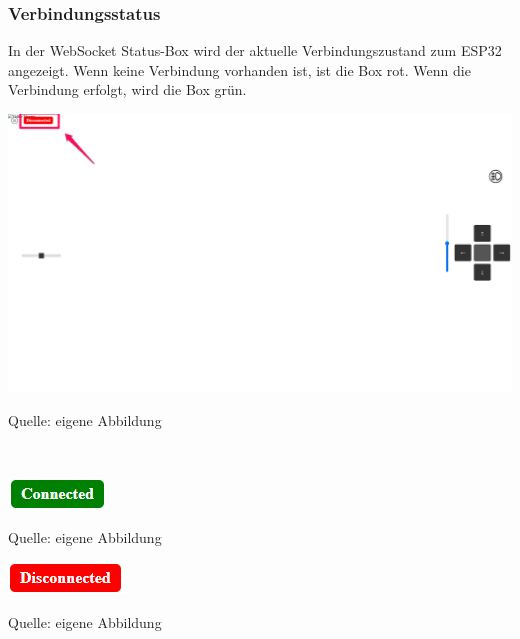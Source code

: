 \documentclass[ngerman,12pt,a4paper]{article}
\begin{document}
				\subsubsection*{Verbindungsstatus}
	
	In der WebSocket Status-Box wird der aktuelle Verbindungszustand zum ESP32 angezeigt. Wenn keine Verbindung vorhanden ist, ist die Box rot. Wenn die Verbindung erfolgt, wird die Box grün. \\[0.5cm]
	\begin{center}
		\begin{minipage}[t]{1\textwidth}
			\includegraphics{Pictures/status-web}
			\label{fig:status-web}
			\vspace{-10pt}
			\begin{center}
				\par\small Quelle: eigene Abbildung 
			\end{center}
		\end{minipage} \\[0.75cm]
	\end{center}
	\begin{center}
		\begin{minipage}[t]{1\textwidth}
			\includegraphics{Pictures/status-green}
			\label{fig:status-green}
			\vspace{-10pt}
			\begin{center}
				\par\small Quelle: eigene Abbildung 
			\end{center}
			\includegraphics{Pictures/status-red}
			\label{fig:status-red}
			\vspace{-10pt}
			\begin{center}
				\par\small Quelle: eigene Abbildung 
			\end{center}
		\end{minipage} \\[0.75cm]
	\end{center}
\end{document}
